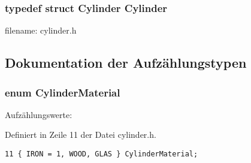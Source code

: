 \subsubsection{\setlength{\rightskip}{0pt plus 5cm}typedef struct {\bf Cylinder}  {\bf Cylinder}}\label{src_2cylinder_8h_2ec2c2961c7ce5a114d969c1f562a563}


filename: cylinder.h 

\subsection{Dokumentation der Aufz\"{a}hlungstypen}
\subsubsection{\setlength{\rightskip}{0pt plus 5cm}enum {\bf Cylinder\-Material}}\label{src_2cylinder_8h_4e5ff3b99924220a69e25e53edcaeb31}


\begin{Desc}
\item[Aufz\"{a}hlungswerte: ]\par
\begin{description}
\item[{\em 
IRON\label{src_2cylinder_8h_4e5ff3b99924220a69e25e53edcaeb3172cfeced8656bc799e87bdc6b1aa7ddf}
}]\item[{\em 
WOOD\label{src_2cylinder_8h_4e5ff3b99924220a69e25e53edcaeb318029fbd172f8364c78bd96ba415014d5}
}]\item[{\em 
GLAS\label{src_2cylinder_8h_4e5ff3b99924220a69e25e53edcaeb312ad3b4e3bd1cb102d5b5d2a436979755}
}]\end{description}
\end{Desc}



Definiert in Zeile 11 der Datei cylinder.h.

\footnotesize\begin{verbatim}11 { IRON = 1, WOOD, GLAS } CylinderMaterial;
\end{verbatim}\normalsize 




